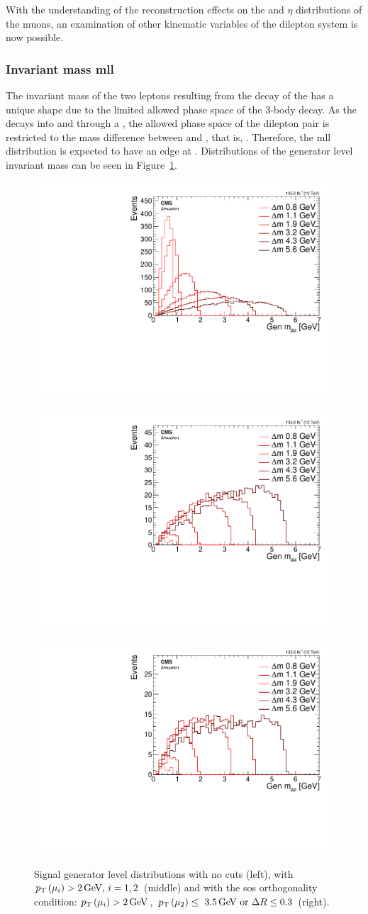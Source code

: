 With the understanding of the reconstruction effects on the \pt and $\eta$ distributions of the muons, an examination of other kinematic variables of the dilepton system is now possible.

\clearpage

\subsubsection{Invariant mass \gls{mll}}
\label{sec:gen-invariant-mass}

The invariant mass of the two leptons resulting from the decay of the \neutt has a unique shape due to the limited allowed phase space of the 3-body decay. As the \neutt decays into \neuto and \ellell through a \PZstar, the allowed phase space of the dilepton pair is restricted to the mass difference between \neutt and \neuto, that is, \dm. Therefore, the \gls{mll} distribution is expected to have an edge at \dm. Distributions of the generator level invariant mass can be seen in Figure~\ref{fig:signal-generator-mll}.

\begin{figure}[!htb]
\centering
\includegraphics[width=0.32\linewidth]{plots/signal_muons_gen/none_gen_invMass.pdf} \,
\includegraphics[width=0.32\linewidth]{plots/signal_muons_gen/none_gen_invMass_cut.pdf}  \,
\includegraphics[width=0.32\linewidth]{plots/signal_muons_gen/none_gen_invMass_orth.pdf} \\
\caption[Signal generator level \mll distributions]{ Signal generator level \mll distributions with no cuts (left), with $p_{\mathrm{T}}\left(\mu_i\right)>2\,\text{Ge\hspace{-.08em}V},\,i=1,2$ (middle) and with the \gls{sos} orthogonality condition: $p_{\mathrm{T}}\left(\mu_i\right)>2\,\text{Ge\hspace{-.08em}V}$, $p_{\mathrm{T}}\left(\mu_2\right)\leq~3.5\,\text{Ge\hspace{-.08em}V}\text{ or }\Delta R\leq 0.3$ (right).}
\label{fig:signal-generator-mll}
\end{figure}

